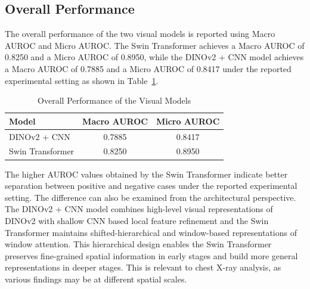 \documentclass[conference]{IEEEtran}
\begin{document}
\subsection{Overall Performance}
The overall performance of the two visual models is reported using Macro AUROC and Micro AUROC.
The Swin Transformer achieves a Macro AUROC of 0.8250 and a Micro AUROC of 0.8950, while the DINOv2 + CNN model achieves a Macro AUROC of 0.7885 and a Micro AUROC of 0.8417 under the reported experimental setting as shown in Table~\ref{tab:overall_performance}.
\begin{table}[H]
\caption{Overall Performance of the Visual Models}
\label{tab:overall_performance}
\centering
\renewcommand{\arraystretch}{1.1}
\begin{tabular}{lcc}
\hline
\textbf{Model} & \textbf{Macro AUROC} & \textbf{Micro AUROC} \\
\hline
DINOv2 + CNN & 0.7885 & 0.8417 \\
Swin Transformer & 0.8250 & 0.8950 \\
\hline
\end{tabular}
\end{table}
The higher AUROC values obtained by the Swin Transformer indicate better separation between positive and negative cases under the reported experimental setting. The difference can also be examined from the architectural perspective. The DINOv2 + CNN model combines high-level visual representations of DINOv2 with shallow CNN based local feature refinement and the Swin Transformer maintains shifted-hierarchical and window-based representations of window attention. This hierarchical design enables the Swin Transformer preserves fine-grained spatial information in early stages and build more general representations in deeper stages. This is relevant to chest X-ray analysis, as various findings may be at different spatial scales.
\end{document}
